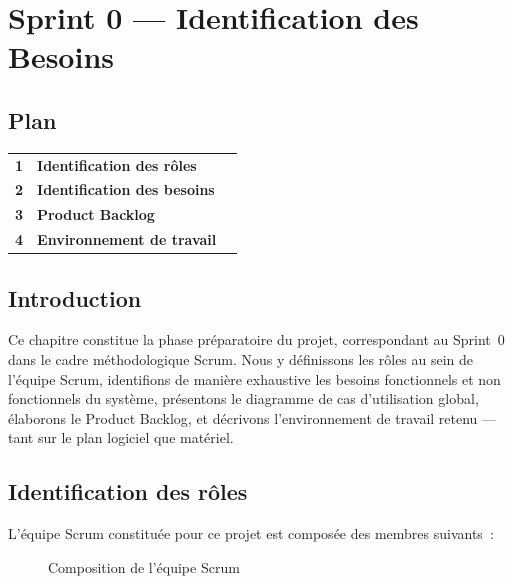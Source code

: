 
\chapter{Sprint 0 --- Identification des Besoins}

\section*{Plan}

\begin{tabular}{r l r}
\textbf{1} & \textbf{Identification des rôles} & \textbf{\pageref{sec:roles}} \\
\textbf{2} & \textbf{Identification des besoins} & \textbf{\pageref{sec:besoins}} \\
\textbf{3} & \textbf{Product Backlog} & \textbf{\pageref{sec:backlog}} \\
\textbf{4} & \textbf{Environnement de travail} & \textbf{\pageref{sec:environnement}} \\
\end{tabular}

\section*{Introduction}

Ce chapitre constitue la phase préparatoire du projet, correspondant au Sprint~0 dans le cadre méthodologique Scrum. Nous y définissons les rôles au sein de l'équipe Scrum, identifions de manière exhaustive les besoins fonctionnels et non fonctionnels du système, présentons le diagramme de cas d'utilisation global, élaborons le Product Backlog, et décrivons l'environnement de travail retenu --- tant sur le plan logiciel que matériel.

\section{Identification des rôles}
\label{sec:roles}

L'équipe Scrum constituée pour ce projet est composée des membres suivants~:

\begin{figure}[H]
    \centering
    \caption{Composition de l'équipe Scrum}
    \label{fig:scrum_team}
\end{figure}

